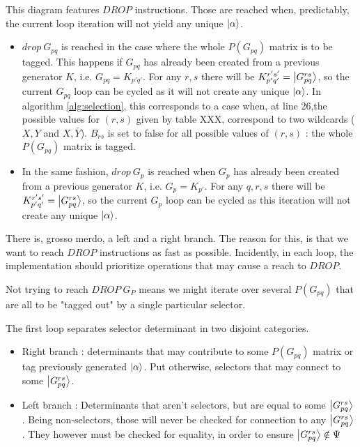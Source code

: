 \documentclass[./thesis.tex]{subfiles}
\begin{document}
This diagram features $DROP$ instructions. Those are reached when, predictably, the current loop iteration will not yield any unique $\ket \alpha$. 

\begin{itemize}
\item
$drop\ G_{pq}$ is reached in the case where the whole $P(G_{pq})$ matrix is to be tagged. This happens if $G_{pq}$ has already been created from a previous generator $K$, i.e. $G_{pq} = K_{p'q'}$. For any $r,s$ there will be $K_{p'q'}^{r's'} = \ket {G_{pq}^{rs}}$, so the current $G_{pq}$ loop can be cycled as it will not create any unique $\ket \alpha$.
In algorithm \ref{alg:selection}, this corresponds to a case when, at line 26,the possible values for $(r,s)$ given by table XXX, correspond to two wildcards ($X,Y$ and $X,\bar Y$). $B_{rs}$ is set to false for all possible values of $(r,s)$ : the whole $P(G_{pq})$ matrix is tagged.
\item
In the same fashion, $drop\ G_{p}$ is reached when $G_{p}$ has already been created from a previous generator $K$, i.e. $G_{p} = K_{p'}$. For any $q,r,s$ there will be $K_{p'q'}^{r's'} = \ket {G_{pq}^{rs}}$, so the current $G_{p}$ loop can be cycled as this iteration will not create any unique $\ket \alpha$.\\
\end{itemize}


There is, grosso merdo, a left and a right branch. The reason for this, is that we want to reach $DROP$ instructions as fast as possible. Incidently, in each loop, the implementation should prioritize operations that may cause a reach to $DROP$.

Not trying to reach $DROP\ G_{P}$ means we might iterate over several $P(G_{pq})$ that are all to be "tagged out" by a single particular selector.

The first loop separates selector determinant in two disjoint categories.

\begin{itemize}
\item
Right branch : determinants that may contribute to some $P(G_{pq})$ matrix or tag previously generated $\ket \alpha$. Put otherwise, selectors that may connect to some $\ket {G_{pq}^{rs}}$.

\item
Left branch : Determinants that aren't selectors, but are equal to some $\ket {G_{pq}^{rs}}$. Being non-selectors, those will never be checked for connection to any $\ket {G_{pq}^{rs}}$. They however must be checked for equality, in order to ensure $\ket {G_{pq}^{rs}} \notin \Psi$
\end{itemize}
\end{document}
